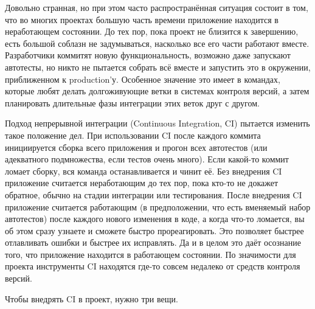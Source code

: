 \documentclass{../../text-style}
\begin{document}
Довольно странная, но при этом часто распространённая ситуация состоит в том, что во многих проектах большую часть времени приложение находится в неработающем состоянии. До тех пор, пока проект не близится к завершению, есть большой соблазн не задумываться, насколько все его части работают вместе. Разработчики коммитят новую функциональность, возможно даже запускают автотесты, но никто не пытается собрать всё вместе и запустить это в окружении, приближенном к production’у. Особенное значение это имеет в командах, которые любят делать долгоживующие ветки в системах контроля версий, а затем планировать длительные фазы интеграции этих веток друг с другом.

Подход непрерывной интеграции (Continuous Integration, CI) пытается изменить такое положение дел. При использовании CI после каждого коммита инициируется сборка всего приложения и прогон всех автотестов (или адекватного подмножества, если тестов очень много). Если какой-то коммит ломает сборку, вся команда останавливается и чинит её. Без внедрения CI приложение считается неработающим до тех пор, пока кто-то не докажет обратное, обычно на стадии интеграции или тестирования. После внедрения CI приложение считается работающим (в предположении, что есть вменяемый набор автотестов) после каждого нового изменения в коде, а когда что-то ломается, вы об этом сразу узнаете и сможете быстро прореагировать. Это позволяет быстрее отлавливать ошибки и быстрее их исправлять. Да и в целом это даёт осознание того, что приложение находится в работающем состоянии. По значимости для проекта инструменты CI находятся где-то совсем недалеко от средств контроля версий.

Чтобы внедрять CI в проект, нужно три вещи.
\end{document}
